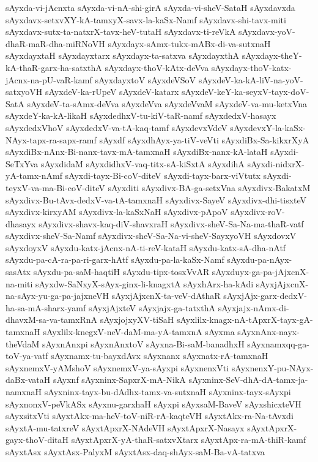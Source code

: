 {sAyxda-vi-jAcnxta
sAyxda-vi-nA-shi-girA
sAyxda-vi-sheV-SataH
sAyxdavxda
sAyxdavx-setxvXY-kA-tamxyX-savx-la-kaSx-Namf
sAyxdavx-shi-tavx-miti
sAyxdavx-sutx-ta-natxrX-tavx-heV-tutaH
sAyxdavx-ti-reVkA
sAyxdavx-yoV-dhaR-maR-dha-miRNoVH
sAyxdayx-sAmx-tukx-mABx-di-va-sutxnaH
sAyxdayxtaH
sAyxdayxtarx
sAyxdayx-ta-satxva
sAyxdayxthA
sAyxdayx-theY-kA-thaR-garx-ha-satxthA
sAyxdayx-thoV-kAtx-deVva
sAyxdayx-thoV-katx-jAcnx-na-pU-vaR-kamf
sAyxdayxtoV
sAyxdeVSoV
sAyxdeV-ka-kA-liV-na-yoV-satxyoVH
sAyxdeV-ka-rUpeV
sAyxdeV-katarx
sAyxdeV-keY-ka-seyxV-tayx-doV-SatA
sAyxdeV-ta-sAmx-deVva
sAyxdeVva
sAyxdeVvaM
sAyxdeV-va-mu-ketxVna
sAyxdeY-ka-kA-likaH
sAyxdedhxV-tu-kiV-taR-namf
sAyxdedxV-hasayx
sAyxdedxVhoV
sAyxdedxV-va-tA-kaq-tamf
sAyxdevxVdeV
sAyxdevxY-la-kaSx-NAyx-tapx-ra-sapx-ramf
sAyxdf
sAyxdhAyx-ya-tiV-veVti
sAyxdiBx-Sa-kikxrXyA
sAyxdiBx-nAnx-Bi-nanx-tavx-mA-tamxnaH
sAyxdiBx-nanx-kA-lataH
sAyxdi-SeTxYva
sAyxdidaM
sAyxdidhxV-vaq-titx-sA-kiSxtA
sAyxdihA
sAyxdi-nidxrX-yA-tamx-nAmf
sAyxdi-tayx-Bi-coV-diteV
sAyxdi-tayx-barx-viVtutx
sAyxdi-teyxV-va-ma-Bi-coV-diteV
sAyxditi
sAyxdivx-BA-ga-setxVna
sAyxdivx-BakatxM
sAyxdivx-Bu-tAvx-dedxV-va-tA-tamxnaH
sAyxdivx-SayeV
sAyxdivx-dhi-tisxteV
sAyxdivx-kirxyAM
sAyxdivx-la-kaSxNaH
sAyxdivx-pApoV
sAyxdivx-roV-dhasayx
sAyxdivx-shavx-kaq-diV-shavxraH
sAyxdivx-sheV-Sa-Na-ma-thaR-vatf
sAyxdivx-sheV-Sa-Namf
sAyxdivx-sheV-Sa-Na-vi-sheV-SayxyoVH
sAyxdovxV
sAyxdoyxV
sAyxdu-katx-jAcnx-nA-ti-reV-kataH
sAyxdu-katx-sA-dha-nAtf
sAyxdu-pa-cA-ra-pa-ri-garx-hAtf
sAyxdu-pa-la-kaSx-Namf
sAyxdu-pa-nAyx-sasAtx
sAyxdu-pa-saM-haqtiH
sAyxdu-tipx-tosxVvAR
sAyxduyx-ga-pa-jAjxcnX-na-miti
sAyxdw-SaNxyX-sAyx-ginx-li-knagxtA
sAyxhArx-ha-kAdi
sAyxjAjxcnX-na-sAyx-yu-ga-pa-jajxneVH
sAyxjAjxcnX-ta-veV-dAthaR
sAyxjAjx-garx-dedxV-ha-sa-mA-sharx-yamf
sAyxjAjxteV
sAyxjajx-ga-tatxthA
sAyxjajx-nAmx-di-dhavxM-sa-va-tamxRnA
sAyxjojxyXV-tiSaH
sAyxlilx-knagx-nA-tApxrX-tayx-gA-tamxnaH
sAyxlilx-knegxV-neV-daM-ma-yA-tamxnA
sAyxma
sAyxnAnx-nayx-theVdaM
sAyxnAnxpi
sAyxnAnxtoV
sAyxna-Bi-saM-banadhxH
sAyxnamxqq-ga-toV-ya-vatf
sAyxnamx-tu-bayxdAvx
sAyxnanx
sAyxnatx-rA-tamxnaH
sAyxnemxV-yAMshoV
sAyxnemxV-ya-sAyxpi
sAyxnenxVti
sAyxnenxY-pu-NAyx-daBx-vataH
sAyxnf
sAyxninx-SapxrX-mA-NikA
sAyxninx-SeV-dhA-dA-tamx-ja-namxnaH
sAyxninx-tayx-bu-dAdhx-tamx-va-sutxnaH
sAyxninx-tayx-sAyxpi
sAyxnonxV-peVkASx
sAyxnu-garxhaH
sAyxpi
sAyxsaM-BaveV
sAyxshicxteVH
sAyxsitxVti
sAyxtAkx-ma-heV-toV-niR-rA-kaqteVH
sAyxtAkx-ra-Na-tAvxdi
sAyxtA-mu-tatxreV
sAyxtApxrX-NAdeVH
sAyxtApxrX-Nasayx
sAyxtApxrX-gayx-thoV-ditaH
sAyxtApxrX-yA-thaR-satxvXtarx
sAyxtApx-ra-mA-thiR-kamf
sAyxtAsx
sAyxtAsx-PalyxM
sAyxtAsx-daq-shAyx-saM-Ba-vA-tatxva
}
